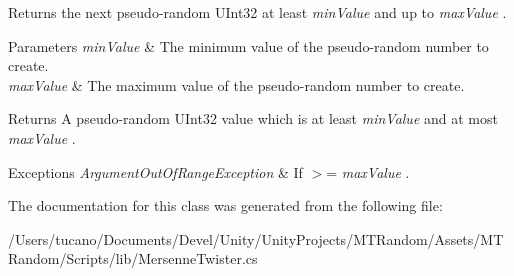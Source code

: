 Returns the next pseudo-\/random U\+Int32 at least {\itshape min\+Value}  and up to {\itshape max\+Value} . 


\begin{DoxyParams}{Parameters}
{\em min\+Value} & The minimum value of the pseudo-\/random number to create.\\
\hline
{\em max\+Value} & The maximum value of the pseudo-\/random number to create.\\
\hline
\end{DoxyParams}
\begin{DoxyReturn}{Returns}
A pseudo-\/random U\+Int32 value which is at least {\itshape min\+Value}  and at most {\itshape max\+Value} . 
\end{DoxyReturn}

\begin{DoxyExceptions}{Exceptions}
{\em Argument\+Out\+Of\+Range\+Exception} & If {  $>$= {\itshape max\+Value} }. \\
\hline
\end{DoxyExceptions}


The documentation for this class was generated from the following file\+:\begin{DoxyCompactItemize}
\item 
/\+Users/tucano/\+Documents/\+Devel/\+Unity/\+Unity\+Projects/\+M\+T\+Random/\+Assets/\+M\+T\+Random/\+Scripts/lib/Mersenne\+Twister.\+cs\end{DoxyCompactItemize}
